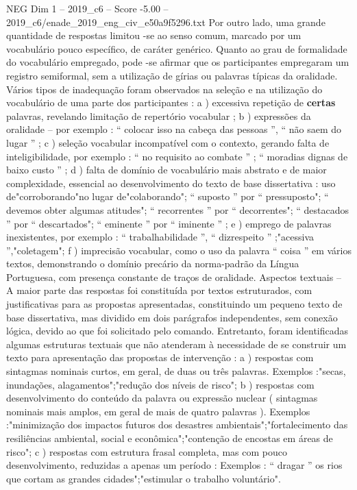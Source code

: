 \begin{textsample}{NEG Dim 1 – 2019\_c6 – Score -5.00 – 2019\_c6/enade\_2019\_eng\_civ\_e50a9f5296.txt}
Por outro lado, uma grande quantidade de respostas limitou -se ao senso comum, marcado por um vocabulário pouco específico, de caráter genérico.
Quanto ao grau de formalidade do vocabulário empregado, pode -se afirmar que os participantes empregaram um registro semiformal, sem a utilização de gírias ou palavras típicas da oralidade.
Vários tipos de inadequação foram observados na seleção e na utilização do vocabulário de uma parte dos participantes : a ) excessiva repetição de \textbf{certas} palavras, revelando limitação de repertório vocabular ; b ) expressões da oralidade – por exemplo : “ colocar isso na cabeça das pessoas ”, “ não saem do lugar ” ; c ) seleção vocabular incompatível com o contexto, gerando falta de inteligibilidade, por exemplo : “ no requisito ao combate ” ; “ moradias dignas de baixo custo ” ; d ) falta de domínio de vocabulário mais abstrato e de maior complexidade, essencial ao desenvolvimento do texto de base dissertativa : uso de"corroborando"no lugar de"colaborando"; “ suposto ” por “ pressuposto"; “ devemos obter algumas atitudes"; “ recorrentes ” por “ decorrentes"; “ destacados ” por “ descartados"; “ eminente ” por “ iminente ” ; e ) emprego de palavras inexistentes, por exemplo : “ trabalhabilidade ”, “ dizrespeito ” ;"acessiva ”,"coletagem"; f ) imprecisão vocabular, como o uso da palavra “ coisa ” em vários textos, demonstrando o domínio precário da norma-padrão da Língua Portuguesa, com presença constante de traços de oralidade.
Aspectos textuais – A maior parte das respostas foi constituída por textos estruturados, com justificativas para as propostas apresentadas, constituindo um pequeno texto de base dissertativa, mas dividido em dois parágrafos independentes, sem conexão lógica, devido ao que foi solicitado pelo comando.
Entretanto, foram identificadas algumas estruturas textuais que não atenderam à necessidade de se construir um texto para apresentação das propostas de intervenção : a ) respostas com sintagmas nominais curtos, em geral, de duas ou três palavras.
Exemplos :"secas, inundações, alagamentos";"redução dos níveis de risco"; b ) respostas com desenvolvimento do conteúdo da palavra ou expressão nuclear ( sintagmas nominais mais amplos, em geral de mais de quatro palavras ).
Exemplos :"minimização dos impactos futuros dos desastres ambientais";"fortalecimento das resiliências ambiental, social e econômica";"contenção de encostas em áreas de risco"; c ) respostas com estrutura frasal completa, mas com pouco desenvolvimento, reduzidas a apenas um período : Exemplos : “ dragar ” os rios que cortam as grandes cidades";"estimular o trabalho voluntário".

\end{textsample}
